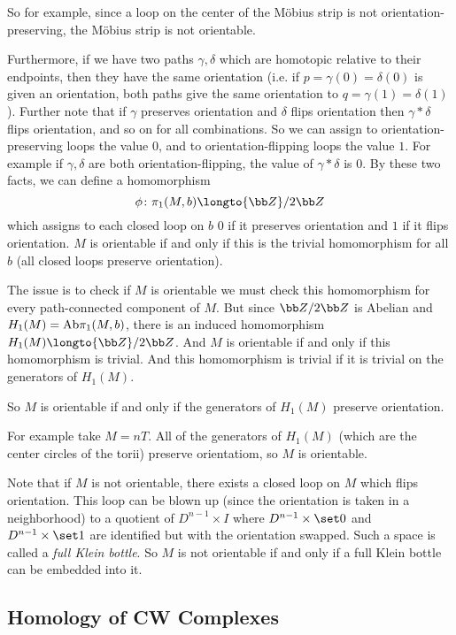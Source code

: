 \ethrm

So for example, since a loop on the center of the M\"obius strip is not orientation-preserving, the M\"obius strip is not orientable.

Furthermore, if we have two paths $\gamma,\delta$ which are homotopic relative to their endpoints, then they have the same orientation (i.e. if $p=\gamma(0)=\delta(0)$ is given an orientation, both paths
give the same orientation to $q=\gamma(1)=\delta(1)$).
Further note that if $\gamma$ preserves orientation and $\delta$ flips orientation then $\gamma*\delta$ flips orientation, and so on for all combinations.
So we can assign to orientation-preserving loops the value $0$, and to orientation-flipping loops the value $1$.
For example if $\gamma,\delta$ are both orientation-flipping, the value of $\gamma*\delta$ is $0$.
By these two facts, we can define a homomorphism
$$ \phi\colon\pi_1(M,b) \longto {\bb Z}/2{\bb Z} $$
which assigns to each closed loop on $b$ $0$ if it preserves orientation and $1$ if it flips orientation.
$M$ is orientable if and only if this is the trivial homomorphism for all $b$ (all closed loops preserve orientation).

The issue is to check if $M$ is orientable we must check this homomorphism for every path-connected component of $M$.
But since ${\bb Z}/2{\bb Z}$ is Abelian and $H_1(M)={\rm Ab}\pi_1(M,b)$, there is an induced homomorphism $H_1(M)\longto{\bb Z}/2{\bb Z}$.
And $M$ is orientable if and only if this homomorphism is trivial.
And this homomorphism is trivial if it is trivial on the generators of $H_1(M)$.

So $M$ is orientable if and only if the generators of $H_1(M)$ preserve orientation.

For example take $M=nT$.
All of the generators of $H_1(M)$ (which are the center circles of the torii) preserve orientatiom, so $M$ is orientable.

Note that if $M$ is not orientable, there exists a closed loop on $M$ which flips orientation.
This loop can be blown up (since the orientation is taken in a neighborhood) to a quotient of $D^{n-1}\times I$ where $D^{n-1}\times\set0$ and $D^{n-1}\times\set1$ are identified but with the orientation
swapped.
Such a space is called a {\it full Klein bottle}.
So $M$ is not orientable if and only if a full Klein bottle can be embedded into it.

\subsection{Homology of CW Complexes}

